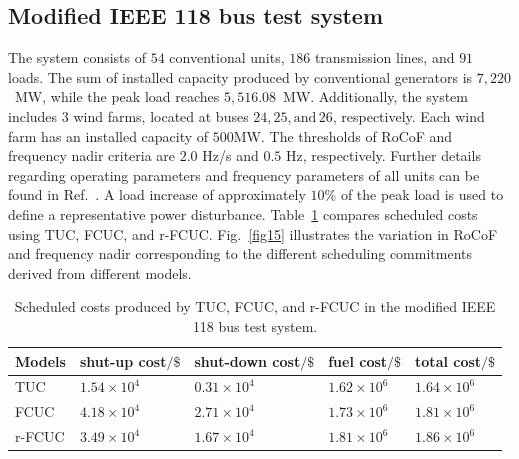 \documentclass[lettersize,journal]{IEEEtran}
\begin{document}

\vspace{-0.1in} \subsection{Modified IEEE 118 bus test system} \vspace{-0.025in}

The system consists of $54$ conventional units, $186$ transmission lines, and $91$ loads. The sum of installed capacity produced by conventional generators is $7,220$~MW, while the peak load reaches $5,516.08$~MW. Additionally, the system includes $3$ wind farms, located at buses $24,25, \text{and} \,26$, respectively. Each wind farm has an installed capacity of $500$MW. The thresholds of RoCoF and frequency nadir criteria are $2.0$ Hz/s and $0.5$ Hz, respectively. Further details regarding operating parameters and frequency parameters of all units can be found in Ref.~\cite{demetriou2015dynamic}. A load increase of approximately $10$\% of the peak load is used to define a representative power disturbance. Table~\ref{table 3} compares scheduled costs using TUC, FCUC, and r-FCUC. Fig.~\ref{fig15} illustrates the variation in RoCoF and frequency nadir corresponding to the different scheduling commitments derived from different models.

 \begin{table}[!t]\vspace{-0.025cm} 
 \caption{Scheduled costs  produced by TUC, FCUC, and r-FCUC in the modified IEEE 118 bus test system.}\label{table 3}
 \resizebox{0.49\textwidth}{0.3in}
{\begin{tabular}{lp{1.65cm}p{}p{1.5cm}p{1.5cm}}
	\hline 
Models & shut-up cost$/\$$ \!\!\!          & shut-down cost$/\$ $     \!\!\!   & fuel cost$/\$ $  \!\!\!           & total cost$/\$ $   \\
\hline 
 TUC    & $1.54\times 10^4 $ & $0.31\times 10^4 $ & $1.62\times 10^6 $ & $1.64 \times 10^6 $ \\
 FCUC   & $4.18\times 10^4 $ & $2.71\times 10^4 $ & $1.73\times 10^6 $ & $1.81 \times 10^6 $ \\
 r-FCUC & $3.49\times 10^4 $ & $1.67\times 10^4 $ & $1.81\times 10^6 $ & $1.86 \times 10^6 $ \\
 \hline \end{tabular}} \end{table}
\end{document}
